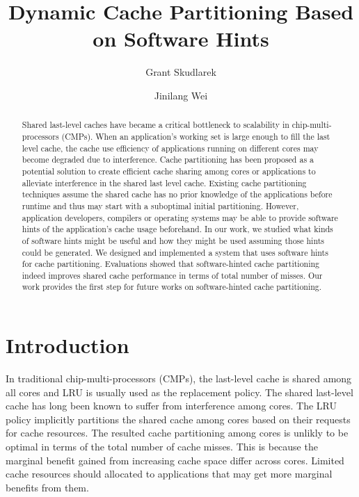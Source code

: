 \documentclass{acm_proc_article-sp}
\title{Dynamic Cache Partitioning Based on Software Hints}
\author{Grant Skudlarek \and Jinilang Wei}
\begin{document}
\maketitle

\begin{abstract}

Shared last-level caches have became a critical bottleneck to scalability in 
chip-multi-processors (CMPs). When an application's working set is large
enough to fill the last level cache, the cache use efficiency of applications running on
different cores may become degraded due to interference. Cache 
partitioning has been proposed as a potential solution to create efficient cache sharing among cores or
applications to alleviate interference in the shared last level cache. Existing cache
partitioning techniques assume the shared cache has no prior knowledge of the 
applications before runtime and thus may start with a suboptimal
initial partitioning. However, application developers, compilers or operating
systems may be able to provide software hints of the application's cache
usage beforehand. In our work, we studied what kinds of software hints might be 
useful and how they might be used assuming those hints could be generated. We
designed and implemented a system that uses software hints for cache 
partitioning. Evaluations showed that software-hinted cache partitioning indeed
improves shared cache performance in terms of total number of misses. Our work
provides the first step for future works on software-hinted cache partitioning.

\end{abstract}

\section{Introduction}

In traditional chip-multi-processors (CMPs), the last-level cache is 
shared among all cores and LRU is usually used as the replacement policy. The shared
last-level cache has long been known to suffer from interference among cores. The 
LRU policy implicitly partitions the shared cache among cores based on their 
requests for cache resources. The resulted cache partitioning among cores is
unlikly to be optimal in terms of the total number of cache misses. This is 
because the marginal benefit gained from increasing cache space differ across 
cores. Limited cache resources should allocated to applications that may get
more marginal benefits from them.
\end{document}
